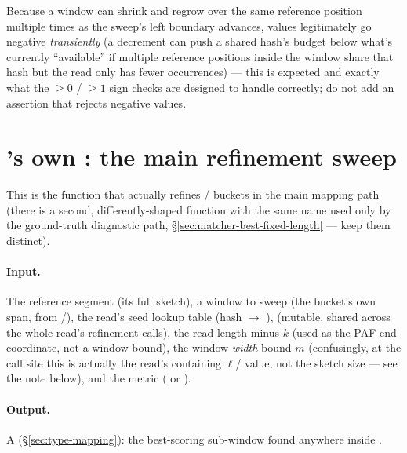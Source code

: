 \begin{notebox}
Because a window can shrink and regrow over the same reference position multiple times as the
sweep's left boundary advances,  values legitimately go negative
\emph{transiently} (a decrement can push a shared hash's budget below what's currently
``available'' if multiple reference positions inside the window share that hash but the read only
has fewer occurrences) --- this is expected and exactly what the $\ge 0$ / $\ge 1$ sign checks are
designed to handle correctly; do not add an assertion that rejects negative values.
\end{notebox}

\section{'s own : the main refinement sweep}
\label{sec:best-fixed-length}

This is the function that actually refines / buckets in the main
mapping path (there is a second, differently-shaped function with the same name used only by the
ground-truth diagnostic path, \S\ref{sec:matcher-best-fixed-length} --- keep them distinct).

\paragraph{Input.} The reference segment (its full sketch), a window \code{[from, to)} to sweep
(the bucket's own span, from /), the read's seed lookup table
(hash $\to$ ),  (mutable, shared across the whole read's refinement
calls), the read length minus $k$ (used as the PAF end-coordinate, not a window bound), the window
\emph{width} bound $m$ (confusingly, at the call site this is actually the read's containing
$\ell$/ value, not the sketch size --- see the note below), and the metric
( or ).

\paragraph{Output.} A  (\S\ref{sec:type-mapping}): the best-scoring sub-window
found anywhere inside \code{[from, to)}.

